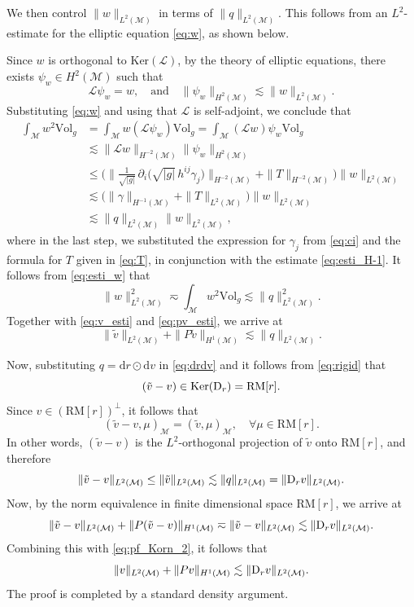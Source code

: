 \documentclass[11pt,a4paper,oneside,reqno]{amsart}
\theoremstyle{definition}
\theoremstyle{plain}
\numberwithin{theorem}{section}
\numberwithin{proposition}{section}
\numberwithin{lemma}{section}
\numberwithin{equation}{section}
\newcommand{\Ker}{\text{Ker}}
\newcommand{\Man}{\mathcal{M}}
\newcommand{\RM}{\mathrm{RM}}
\newcommand{\Vol}{\mathrm{Vol}}
\begin{document}
 We then control $\|w\|_{L^2(\Man)}$ in terms of $\|q\|_{L^2(\Man)}$. This follows from an \(L^2\)-estimate for the elliptic equation \eqref{eq:w}, as shown below.

Since \( w \) is orthogonal to \( \Ker(\mathcal{L}) \), by the theory of elliptic equations, there exists \( \psi_w \in H^2(\Man) \) such that
\[
\mathcal{L} \psi_w = w, \quad \text{and} \quad 
\| \psi_w \|_{H^2(\Man)} \lesssim \| w \|_{L^2(\Man)}.
\]
Substituting \eqref{eq:w} and using that $\mathcal{L}$ is self-adjoint,  we conclude that
\begin{equation}\label{eq:esti_w}
\begin{aligned}
         \int_\Man w^2 \Vol_{g} &= \int_\Man w (\mathcal{L} \psi_w) \Vol_{g}
     = \int_\Man (\mathcal{L} w)  \psi_w\Vol_{g}\\
     &\lesssim \| \mathcal{L} w  \|_{H^{-2}(\Man)} \| \psi_w \|_{H^2(\Man)} \\ 
     & \leq \Big( \| \frac{1}{\sqrt{|g|}} \, \partial_i \bigl( \sqrt{|g|} \, h^{ij} \gamma_j \bigr)\|_{H^{-2}(\Man)} + \| T \|_{H^{-2}(\Man)}
        \Big) \| w \|_{L^2(\Man)} \\
     & \lesssim \Big( \|  \gamma \|_{H^{-1}(\Man)} + \| T \|_{L^2(\Man)}
        \Big) \| w \|_{L^2(\Man)}    \\ 
     & \lesssim  \|  q \|_{L^2(\Man)}  \| w \|_{L^2(\Man)},     
\end{aligned}
\end{equation} 
where in the last step, we substituted the expression for $\gamma_j$ from \eqref{eq:ci} and the formula for $T$ given in \eqref{eq:T}, in conjunction with the estimate \eqref{eq:esti_H-1}. It follows from \eqref{eq:esti_w} that 
\[ \| w \|_{L^2(\Man)}^2 \eqsim   \int_\Man w^2 \Vol_g  \lesssim  \|  q \|_{L^2(\Man)}^2. \]
Together with \eqref{eq:v_esti} and \eqref{eq:pv_esti}, we arrive at
\begin{equation}\label{eq:pf_Korn_2}
\|\tilde v\|_{L^2(\Man)} + \|P \tilde v\|_{H^1(\Man)} \lesssim \|q\|_{L^2(\Man)}.
\end{equation}

 Now, substituting $q = \mathrm{d}r \odot \mathrm{d}v$ in \eqref{eq:drdv} and it follows from 
\eqref{eq:rigid} that 
\[
(\tilde{v} - v) \in \Ker({\rm D}_r) = \RM[r].
\]
Since $v \in (\RM[r])^{\perp}$, it follows that
\[ (\tilde v - v, \mu)_{\Man} = (\tilde v, \mu)_{\Man}, \quad \forall \mu \in \RM[r]. \]
In other words, $(\tilde v - v)$ is the $L^2$-orthogonal projection of $\tilde v$ onto $\RM[r]$, and therefore
\[ \| \tilde v - v \|_{L^2(\Man)} \leq  \| \tilde  v \|_{L^2(\Man)} \lesssim \|q\|_{L^2(\Man)}= 
\|{\rm D}_r v\|_{L^2(\Man)}. \]
Now, by the norm equivalence in finite dimensional space $\RM[r]$, we arrive at
\begin{equation}\label{eq:pf_Korn_3}
\| \tilde v - v \|_{L^2(\Man)} + \| P (\tilde v - v) \|_{H^1(\Man)} 
\eqsim  \| \tilde v - v \|_{L^2(\Man)}  
\lesssim \|{\rm D}_r v\|_{L^2(\Man)}.
\end{equation} 
Combining this with \eqref{eq:pf_Korn_2}, it follows that
\[
\|v\|_{L^2(\Man)} + \|Pv\|_{H^1(\Man)} 
\lesssim \|{\rm D}_r v\|_{L^2(\Man)}.
\]
The proof is completed by a standard density argument.
\end{document}
